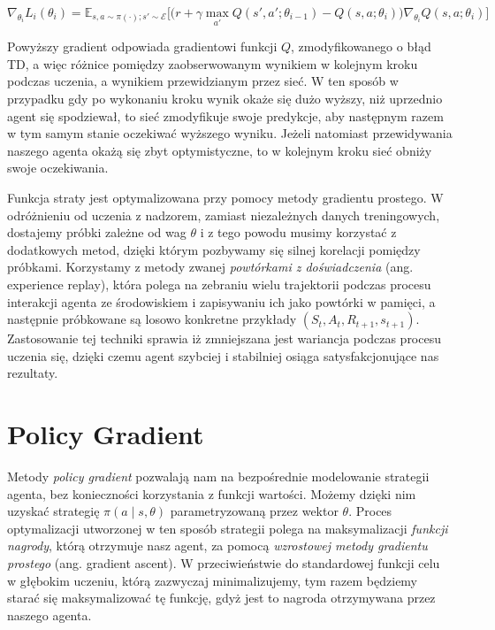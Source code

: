 \documentclass[licencjacka]{pracamgr}
\begin{document}
$$ \nabla_{\theta_i}L_i(\theta_i) = \mathbb{E}_{s, a \sim \pi(\cdot); s' \sim \mathcal{E}} 
\Big[ \Big( r + \gamma \max_{a'} Q(s', a'; \theta_{i - 1}) - Q(s, a; \theta_i) \Big) \nabla_{\theta_i} Q(s, a; \theta_i) \Big] $$

Powyższy gradient odpowiada gradientowi funkcji $Q$, zmodyfikowanego o błąd TD, a więc różnice pomiędzy zaobserwowanym wynikiem w kolejnym kroku podczas uczenia, a wynikiem przewidzianym przez sieć. W ten sposób w przypadku gdy po wykonaniu kroku wynik okaże się dużo wyższy, niż uprzednio agent się spodziewał, to sieć zmodyfikuje swoje predykcje, aby następnym razem w tym samym stanie oczekiwać wyższego wyniku. Jeżeli natomiast przewidywania naszego agenta okażą się zbyt optymistyczne, to w kolejnym kroku sieć obniży swoje oczekiwania.

Funkcja straty jest optymalizowana przy pomocy metody gradientu prostego. W odróżnieniu od uczenia z nadzorem, zamiast niezależnych danych treningowych, dostajemy próbki zależne od wag $\theta$ i z tego powodu musimy korzystać z dodatkowych metod, dzięki którym pozbywamy się silnej korelacji pomiędzy próbkami. Korzystamy z metody zwanej \emph{powtórkami z doświadczenia} (ang. experience replay), która polega na zebraniu wielu trajektorii podczas procesu interakcji agenta ze środowiskiem i zapisywaniu ich jako powtórki w pamięci, a następnie próbkowane są losowo konkretne przykłady $(S_t, A_t, R_{t+1}, s_{t+1})$. Zastosowanie tej techniki sprawia iż zmniejszana jest wariancja podczas procesu uczenia się, dzięki czemu agent szybciej i stabilniej osiąga satysfakcjonujące nas rezultaty.


\section{Policy Gradient}

Metody \emph{policy gradient} \cite{policy-gradient-sutton} pozwalają nam na bezpośrednie modelowanie strategii agenta, bez konieczności korzystania z funkcji wartości. Możemy dzięki nim uzyskać strategię $\pi(a \mid s, \theta)$ parametryzowaną przez wektor $\theta$. Proces optymalizacji utworzonej w ten sposób strategii polega na maksymalizacji \emph{funkcji nagrody}, którą otrzymuje nasz agent, za pomocą \emph{wzrostowej metody gradientu prostego} (ang. gradient ascent). W przeciwieństwie do standardowej funkcji celu w głębokim uczeniu, którą zazwyczaj minimalizujemy, tym razem będziemy starać się maksymalizować tę funkcję, gdyż jest to nagroda otrzymywana przez naszego agenta.
\end{document}
